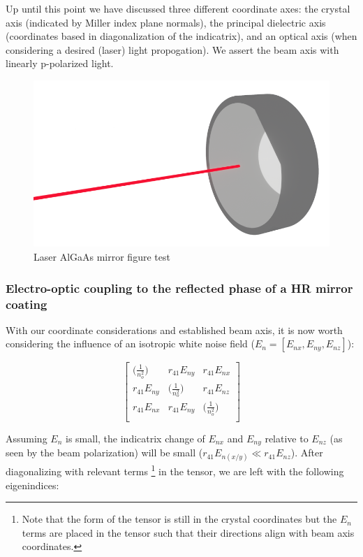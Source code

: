 Up until this point we have discussed three different coordinate axes: the crystal axis (indicated by Miller index plane normals), the principal dielectric axis (coordinates based in diagonalization of the indicatrix), and an optical axis (when considering a desired (laser) light propogation). We assert the beam axis \cite{fig:algaas_coords} with linearly p-polarized light.
\begin{figure}[H]
\begin{center}
\includegraphics[width=.45\textwidth]{figs/ALGAAS/laser_mirror_test2.png}
\end{center}
\caption{Laser AlGaAs mirror figure test}
\label{fig:algaas_mirror}
\end{figure}
\subsubsection{Electro-optic coupling to the reflected phase of a HR mirror coating}
With our coordinate considerations and established beam axis, it is now worth considering the influence of an isotropic white noise field ($E_n = [E_{nx},E_{ny},E_{nz}]$):

\begin{equation}
 \left[ {\begin{array}{ccc}
   \big( \frac{1}{n_o ^2} \big)& r_{41}E_{ny} & r_{41} E_{nx}\\
   r_{41}E_{ny} & \big( \frac{1}{n_o ^2} \big) & r_{41} E_{nz}\\
   r_{41} E_{nx} & r_{41} E_{ny} & \big( \frac{1}{n_o ^2} \big)\\
  \end{array}} \right]
\end{equation}

Assuming $E_n$ is small, the indicatrix change of $E_{nx}$ and $E_{ny}$ relative to $E_{nz}$ (as seen by the beam polarization) will be small ($r_{41}E_{n(x/y)} \ll r_{41}E_{nz}$). After diagonalizing with relevant terms \footnote{Note that the form of the tensor is still in the crystal coordinates but the $E_n$ terms are placed in the tensor such that their directions align with beam axis coordinates.} in the tensor, we are left with the following eigenindices:

